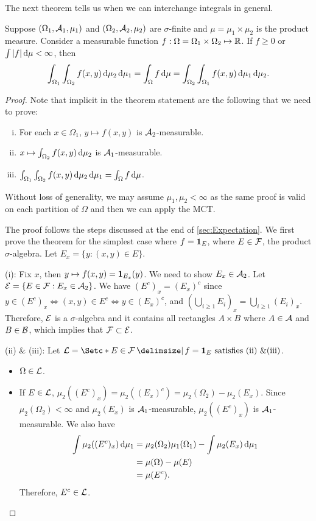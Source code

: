 \documentclass[12pt]{article}
\begin{document}
The next theorem tells us when we can interchange integrals in general.
\begin{Theorem}\label{wk5:Fubini_theorem}
Suppose $(\Omega_1, \mathcal{A}_1, \mu_1)$ and $(\Omega_2, \mathcal{A}_2, \mu_2)$ are $\sigma$-finite and $\mu = \mu_1 \times \mu_2$ is the product measure. Consider a measurable function $f:\Omega=\Omega_1\times\Omega_2 \mapsto \mathbb{R}$. If $f \geq 0$ or $\int{|f|} \,\mathrm{d}\mu< \infty$, then
\begin{align*}
\int_{\Omega_1} \int_{\Omega_2} f (x,y) \,\mathrm{d} \mu_2 \,\mathrm{d} \mu_1 = \int_{\Omega} f \,\mathrm{d} \mu = \int_{\Omega_2} \int_{\Omega_1} f (x,y) \,\mathrm{d} \mu_1 \,\mathrm{d} \mu_2.
\end{align*}
\end{Theorem}
\begin{proof}
Note that implicit in the theorem statement are the following that we need to prove:
\begin{enumerate}[(i)]
\item For each $x \in \Omega_1$, $y \mapsto f(x,y)$ is $\mathcal{A}_2$-measurable.
\item  $x \mapsto \int_{\Omega_2} f(x,y) \,\mathrm{d} \mu_2$ is $\mathcal{A}_1$-measurable.
\item $\int_{\Omega_1} \int_{\Omega_2} f (x,y) \,\mathrm{d} \mu_2 \,\mathrm{d} \mu_1 = \int_{\Omega} f \,\mathrm{d} \mu$.
\end{enumerate}
Without loss of generality, we may assume $\mu_1,\mu_2<\infty$ as the same proof is valid on each partition of $\Omega$ and then we can apply the MCT.

The proof follows the steps discussed at the end of \cref{sec:Expectation}. We first prove the theorem for the simplest case where $f = {\bf 1}_{E}$, where $E\in \mathcal{F}$, the product $\sigma$-algebra. Let $E_x=\{y:(x,y)\in E\}$. 

(i): Fix $x$, then $y \mapsto f(x,y)= {\bf 1}_{E_x}(y)$. We need to show $E_x \in \mathcal{A}_2$. Let $\mathcal{E}=\{E \in \mathcal{F} : E_x \in \mathcal{A}_2\}$. We have $(E^c)_x=(E_x)^c$ since $y \in (E^c)_x \Leftrightarrow (x,y)\in E^c \Leftrightarrow y\in (E_x)^c$, and $\left(\bigcup_{i\geq1} E_i\right)_x = \bigcup_{i\geq1} (E_i)_x$. Therefore, $\mathcal{E}$ is a $\sigma$-algebra and it contains all rectangles $A \times B$ where $A\in \mathcal{A}$ and $B\in \mathcal{B}$, which implies that $\mathcal{F} \subset \mathcal{E}$.

(ii) $\&$ (iii): Let $\calL=\set*{E \in \calF\given f= \indicatore{E} \text{ satisfies (ii) \&(iii)}}$. 
\begin{itemize}
\item $\Omega \in \mathcal{L}$.
\item  If $E \in \mathcal{L}$, $\mu_2((E^c)_x) =\mu_2((E_x)^c)=\mu_2(\Omega_2)-\mu_2(E_x)$. Since $\mu_2(\Omega_2)< \infty$ and $\mu_2(E_x)$ is $\mathcal{A}_1$-measurable, $\mu_2((E^c)_x)$ is $\mathcal{A}_1$-measurable. We also have
\begin{align*}
\int \mu_2((E^c)_x) \,\mathrm{d} \mu_1
& =\mu_2(\Omega_2)\mu_1(\Omega_1)-\int \mu_2(E_x) \,\mathrm{d} \mu_1\\
& =\mu(\Omega)-\mu(E)\\
& =\mu(E^c).
\end{align*}
Therefore, $E^c \in \mathcal{L}$.


\end{itemize}
\end{proof}
\end{document}
